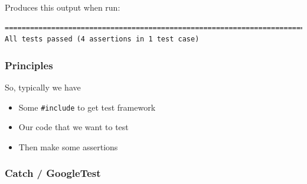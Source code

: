 \begin{Shaded}
\begin{Highlighting}[]

    
      
\NormalTok{\}}

\NormalTok{, } \NormalTok{) \{}
    \NormalTok{) == } \NormalTok{);}
    \NormalTok{) == } \NormalTok{);}
    \NormalTok{) == } \NormalTok{);}
    \NormalTok{) == } \NormalTok{);}
\NormalTok{\}}
\end{Highlighting}
\end{Shaded}

Produces this output when run:

\begin{verbatim}
===============================================================================
All tests passed (4 assertions in 1 test case)

\end{verbatim}

\subsubsection{Principles}\label{principles}

So, typically we have

\begin{itemize}
\itemsep1pt\parskip0pt
\item
  Some \texttt{\#include} to get test framework
\item
  Our code that we want to test
\item
  Then make some assertions
\end{itemize}

\subsubsection{Catch / GoogleTest}\label{catch-googletest}

